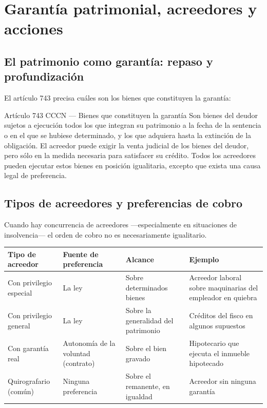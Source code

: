 \documentclass[12pt,oneside]{book}
\newenvironment{tabla}{%
    \par\medskip\begingroup\small\renewcommand{\arraystretch}{1.3}\noindent\ignorespaces
}{%
    \par\endgroup\medskip
}
\begin{document}
\chapter{Garantía patrimonial, acreedores y acciones}
\label{ch:garantia}

\section{El patrimonio como garantía: repaso y profundización}

El artículo 743 precisa cuáles son los bienes que constituyen la garantía:

\begin{norma}{Artículo 743 CCCN --- Bienes que constituyen la garantía}
Son bienes del deudor sujetos a ejecución todos los que integran su patrimonio a la fecha de la sentencia o en el que se hubiese determinado, y los que adquiera hasta la extinción de la obligación. El acreedor puede exigir la venta judicial de los bienes del deudor, pero sólo en la medida necesaria para satisfacer su crédito. Todos los acreedores pueden ejecutar estos bienes en posición igualitaria, excepto que exista una causa legal de preferencia.
\end{norma}

\section{Tipos de acreedores y preferencias de cobro}

Cuando hay concurrencia de acreedores ---especialmente en situaciones de insolvencia--- el orden de cobro no es necesariamente igualitario.

\begin{tabla}
\begin{tabularx}{\textwidth}{B{2.7cm}YYY}
\toprule
Tipo de acreedor & \textbf{Fuente de preferencia} & \textbf{Alcance} & \textbf{Ejemplo} \\
\midrule
Con privilegio especial & La ley & Sobre determinados bienes & Acreedor laboral sobre maquinarias del empleador en quiebra \\
Con privilegio general & La ley & Sobre la generalidad del patrimonio & Créditos del fisco en algunos supuestos \\
Con garantía real & Autonomía de la voluntad (contrato) & Sobre el bien gravado & Hipotecario que ejecuta el inmueble hipotecado \\
Quirografario (común) & Ninguna preferencia & Sobre el remanente, en igualdad & Acreedor sin ninguna garantía \\
\bottomrule
\end{tabularx}
\end{tabla}
\end{document}
